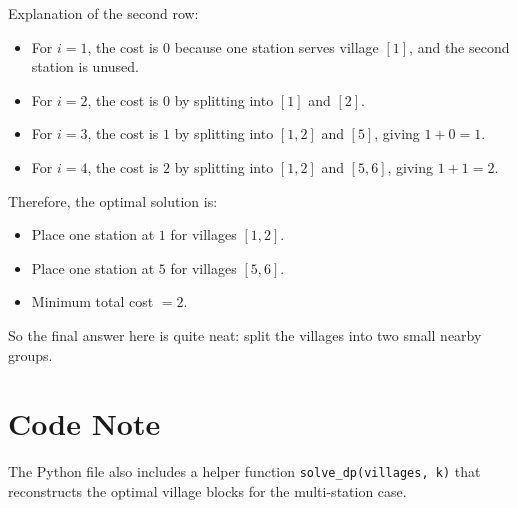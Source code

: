 \documentclass[12pt]{article}
\begin{document}
Explanation of the second row:
\begin{itemize}
    \item For \(i=1\), the cost is \(0\) because one station serves village \([1]\), and the second station is unused.
    \item For \(i=2\), the cost is \(0\) by splitting into \([1]\) and \([2]\).
    \item For \(i=3\), the cost is \(1\) by splitting into \([1,2]\) and \([5]\), giving \(1+0=1\).
    \item For \(i=4\), the cost is \(2\) by splitting into \([1,2]\) and \([5,6]\), giving \(1+1=2\).
\end{itemize}

Therefore, the optimal solution is:
\begin{itemize}
    \item Place one station at \(1\) for villages \([1,2]\).
    \item Place one station at \(5\) for villages \([5,6]\).
    \item Minimum total cost \(=2\).
\end{itemize}
So the final answer here is quite neat: split the villages into two small nearby groups.

\section*{Code Note}

The Python file also includes a helper function \texttt{solve\_dp(villages, k)} that reconstructs the optimal village blocks for the multi-station case.
\end{document}
